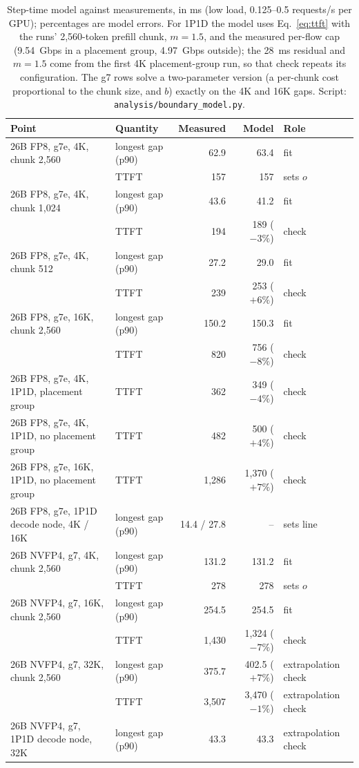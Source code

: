 \documentclass[11pt]{article}
\begin{document}
\begin{table}[!htbp]
\centering\small
\begin{tabularx}{\linewidth}{Llrrl}
\toprule
Point & Quantity & Measured & Model & Role \\
\midrule
26B FP8, g7e, 4K, chunk 2,560 & longest gap (p90) & 62.9 & 63.4 & fit \\
 & TTFT & 157 & 157 & sets $o$ \\
26B FP8, g7e, 4K, chunk 1,024 & longest gap (p90) & 43.6 & 41.2 & fit \\
 & TTFT & 194 & 189 ($-3\%$) & check \\
26B FP8, g7e, 4K, chunk 512 & longest gap (p90) & 27.2 & 29.0 & fit \\
 & TTFT & 239 & 253 ($+6\%$) & check \\
26B FP8, g7e, 16K, chunk 2,560 & longest gap (p90) & 150.2 & 150.3 & fit \\
 & TTFT & 820 & 756 ($-8\%$) & check \\
26B FP8, g7e, 4K, 1P1D, placement group & TTFT & 362 & 349 ($-4\%$) & check \\
26B FP8, g7e, 4K, 1P1D, no placement group & TTFT & 482 & 500 ($+4\%$) & check \\
26B FP8, g7e, 16K, 1P1D, no placement group & TTFT & 1,286 & 1,370 ($+7\%$) & check \\
26B FP8, g7e, 1P1D decode node, 4K / 16K & longest gap (p90) & 14.4 / 27.8 & -- & sets line \\
\midrule
26B NVFP4, g7, 4K, chunk 2,560 & longest gap (p90) & 131.2 & 131.2 & fit \\
 & TTFT & 278 & 278 & sets $o$ \\
26B NVFP4, g7, 16K, chunk 2,560 & longest gap (p90) & 254.5 & 254.5 & fit \\
 & TTFT & 1,430 & 1,324 ($-7\%$) & check \\
26B NVFP4, g7, 32K, chunk 2,560 & longest gap (p90) & 375.7 & 402.5 ($+7\%$) & extrapolation check \\
 & TTFT & 3,507 & 3,470 ($-1\%$) & extrapolation check \\
26B NVFP4, g7, 1P1D decode node, 32K & longest gap (p90) & 43.3 & 43.3 & extrapolation check \\
\bottomrule
\end{tabularx}
\caption{Step-time model against measurements, in ms (low load, 0.125--0.5 requests/s per GPU); percentages are model errors. For 1P1D the model uses Eq.~\eqref{eq:ttft} with the runs' 2,560-token prefill chunk, $m = 1.5$, and the measured per-flow cap (9.54~Gbps in a placement group, 4.97~Gbps outside); the 28~ms residual and $m = 1.5$ come from the first 4K placement-group run, so that check repeats its configuration. The g7 rows solve a two-parameter version (a per-chunk cost proportional to the chunk size, and $b$) exactly on the 4K and 16K gaps. Script: \texttt{analysis/boundary\_model.py}.}
\label{tab:model}
\end{table}
\end{document}
